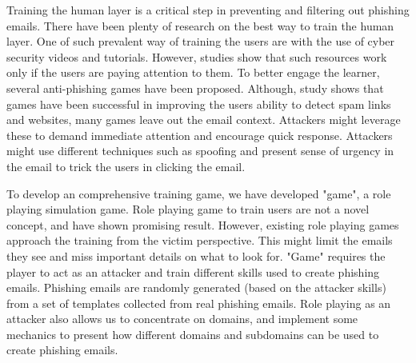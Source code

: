Training the human layer is a critical step in preventing and filtering out phishing emails. There have been plenty of research on the best way to train the human layer. One of such prevalent way of training the users are with the use of cyber security videos and tutorials. However, studies show that such resources work only if the users are paying attention to them\cite{kumaraguru_sheng_acquisti_cranor_hong_2010}. To better engage the learner, several anti-phishing games have been proposed. Although, study shows that games have been successful in improving the users ability to detect spam links and websites, many games leave out the email context. Attackers might leverage these to demand immediate attention and encourage quick response. Attackers might use different techniques such as spoofing and present sense of urgency in the email to trick the users in clicking the email.

To develop an comprehensive training game, we have developed "game", a role playing simulation game. Role playing game to train users are not a novel concept\cite{what_hack}, and have shown promising result. However, existing role playing games approach the training from the victim perspective. This might limit the emails they see and miss important details on what to look for. "Game" requires the player to act as an attacker and train different skills used to create phishing emails. Phishing emails are randomly generated (based on the attacker skills) from a set of templates collected from real phishing emails. Role playing as an attacker also allows us to concentrate on domains, and implement some mechanics to present how different domains and subdomains can be used to create phishing emails.

